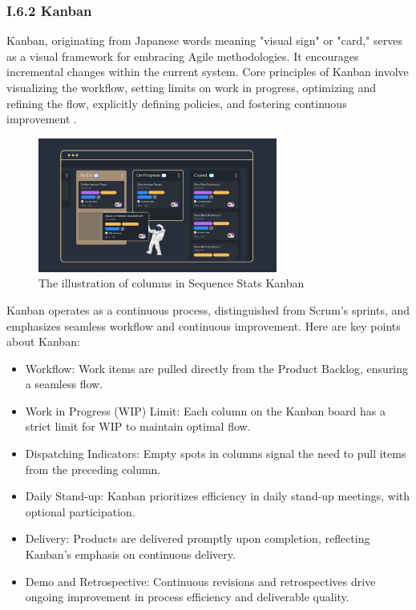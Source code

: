 \subsubsection*{I.6.2 Kanban}
Kanban, originating from Japanese words meaning "visual sign" or "card," serves as a visual framework for embracing Agile methodologies. It encourages incremental changes within the current system. Core principles of Kanban involve visualizing the workflow, setting limits on work in progress, optimizing and refining the flow, explicitly defining policies, and fostering continuous improvement .


\begin{figure}[H]
    \centering
    \includegraphics[width=0.7\textwidth]{src/assets/chapters/kanban.png}
    \caption{The illustration of columns in Sequence Stats Kanban}
    \label{fig:Kanban_Framework_image}
\end{figure}

Kanban operates as a continuous process, distinguished from Scrum's sprints, and emphasizes seamless workflow and continuous improvement. Here are key points about Kanban:

\begin{itemize}
    \item Workflow: Work items are pulled directly from the Product Backlog, ensuring a seamless flow.
    \item Work in Progress (WIP) Limit: Each column on the Kanban board has a strict limit for WIP to maintain optimal flow.
    \item Dispatching Indicators: Empty spots in columns signal the need to pull items from the preceding column.
    \item Daily Stand-up: Kanban prioritizes efficiency in daily stand-up meetings, with optional participation.
    \item Delivery: Products are delivered promptly upon completion, reflecting Kanban's emphasis on continuous delivery.
    \item Demo and Retrospective: Continuous revisions and retrospectives drive ongoing improvement in process efficiency and deliverable quality.
\end{itemize}


